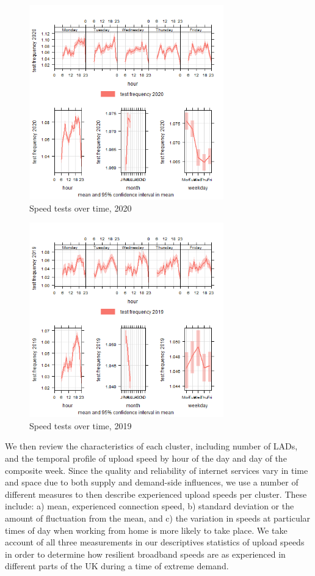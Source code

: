 \documentclass[]{interact}
\theoremstyle{plain}%
\theoremstyle{definition}
\theoremstyle{remark}
\begin{document}
\begin{figure}
\centering
\includegraphics[width=0.75\textwidth,height=0.4\textheight]{figures/time.var.plot2020.png}
\caption{Speed tests over time, 2020 \label{test2020}}
\end{figure}

\begin{figure}
\centering
\includegraphics[width=0.75\textwidth,height=0.4\textheight]{figures/time.var.plot2019.png}
\caption{Speed tests over time, 2019 \label{test2019}}
\end{figure}

We then review the characteristics of each cluster, including number of
LADs, and the temporal profile of upload speed by hour of the day and
day of the composite week. Since the quality and reliability of internet
services vary in time and space due to both supply and demand-side
influences, we use a number of different measures to then describe
experienced upload speeds per cluster. These include: a) mean,
experienced connection speed, b) standard deviation or the amount of
fluctuation from the mean, and c) the variation in speeds at particular
times of day when working from home is more likely to take place. We
take account of all three measurements in our descriptives statistics of
upload speeds in order to determine how resilient broadband speeds are
as experienced in different parts of the UK during a time of extreme
demand.
\end{document}

